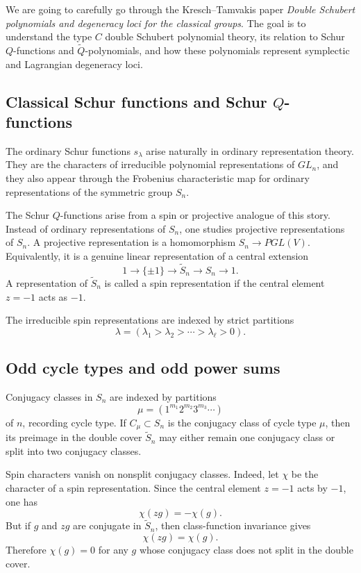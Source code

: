 \documentclass[12pt]{article}
\begin{document}
We are going to carefully go through the Kresch--Tamvakis paper
\emph{Double Schubert polynomials and degeneracy loci for the classical groups}. The goal is to understand the type $C$ double Schubert polynomial theory, its relation to Schur $Q$-functions and $\widetilde Q$-polynomials, and how these polynomials represent symplectic and Lagrangian degeneracy loci.

\subsection{Classical Schur functions and Schur $Q$-functions}

The ordinary Schur functions $s_\lambda$ arise naturally in ordinary representation theory. They are the characters of irreducible polynomial representations of $GL_n$, and they also appear through the Frobenius characteristic map for ordinary representations of the symmetric group $S_n$.

The Schur $Q$-functions arise from a spin or projective analogue of this story. Instead of ordinary representations of $S_n$, one studies projective representations of $S_n$. A projective representation is a homomorphism $S_n \longrightarrow PGL(V)$.
Equivalently, it is a genuine linear representation of a central extension
\[
    1 \longrightarrow \{\pm 1\}
    \longrightarrow \widetilde S_n
    \longrightarrow S_n
    \longrightarrow 1.
\]
A representation of $\widetilde S_n$ is called a spin representation if the central element $z=-1$ acts as $-1$.

The irreducible spin representations are indexed by strict partitions
\[
    \lambda=(\lambda_1>\lambda_2>\cdots>\lambda_\ell>0).
\]


\subsection{Odd cycle types and odd power sums}

Conjugacy classes in $S_n$ are indexed by partitions
\[
    \mu=(1^{m_1}2^{m_2}3^{m_3}\cdots)
\]
of $n$, recording cycle type. If $C_\mu\subset S_n$ is the conjugacy class of cycle type $\mu$, then its preimage in the double cover $\widetilde S_n$ may either remain one conjugacy class or split into two conjugacy classes.

Spin characters vanish on nonsplit conjugacy classes. Indeed, let $\chi$ be the character of a spin representation. Since the central element $z=-1$ acts by $-1$, one has
\[
    \chi(zg)=-\chi(g).
\]
But if $g$ and $zg$ are conjugate in $\widetilde S_n$, then class-function invariance gives
\[
    \chi(zg)=\chi(g).
\]
Therefore $\chi(g)=0$ for any $g$ whose conjugacy class does not split in the double cover.
\end{document}
